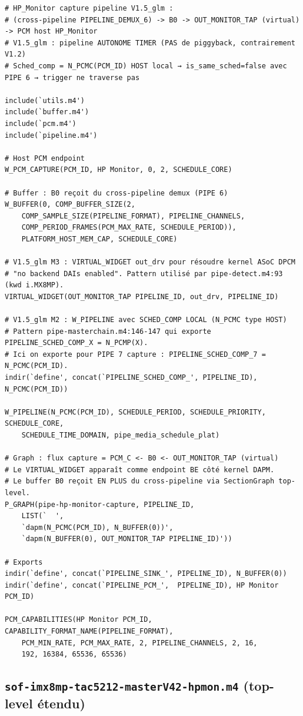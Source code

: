 \documentclass[11pt,a4paper]{article}
\begin{document}
\begin{lstlisting}[language={}, basicstyle=\ttfamily\scriptsize]
# HP_Monitor capture pipeline V1.5_glm :
# (cross-pipeline PIPELINE_DEMUX_6) -> B0 -> OUT_MONITOR_TAP (virtual) -> PCM host HP_Monitor
# V1.5_glm : pipeline AUTONOME TIMER (PAS de piggyback, contrairement V1.2)
# Sched_comp = N_PCMC(PCM_ID) HOST local → is_same_sched=false avec PIPE 6 → trigger ne traverse pas

include(`utils.m4')
include(`buffer.m4')
include(`pcm.m4')
include(`pipeline.m4')

# Host PCM endpoint
W_PCM_CAPTURE(PCM_ID, HP Monitor, 0, 2, SCHEDULE_CORE)

# Buffer : B0 reçoit du cross-pipeline demux (PIPE 6)
W_BUFFER(0, COMP_BUFFER_SIZE(2,
	COMP_SAMPLE_SIZE(PIPELINE_FORMAT), PIPELINE_CHANNELS,
	COMP_PERIOD_FRAMES(PCM_MAX_RATE, SCHEDULE_PERIOD)),
	PLATFORM_HOST_MEM_CAP, SCHEDULE_CORE)

# V1.5_glm M3 : VIRTUAL_WIDGET out_drv pour résoudre kernel ASoC DPCM
# "no backend DAIs enabled". Pattern utilisé par pipe-detect.m4:93 (kwd i.MX8MP).
VIRTUAL_WIDGET(OUT_MONITOR_TAP PIPELINE_ID, out_drv, PIPELINE_ID)

# V1.5_glm M2 : W_PIPELINE avec SCHED_COMP LOCAL (N_PCMC type HOST)
# Pattern pipe-masterchain.m4:146-147 qui exporte PIPELINE_SCHED_COMP_X = N_PCMP(X).
# Ici on exporte pour PIPE 7 capture : PIPELINE_SCHED_COMP_7 = N_PCMC(PCM_ID).
indir(`define', concat(`PIPELINE_SCHED_COMP_', PIPELINE_ID), N_PCMC(PCM_ID))

W_PIPELINE(N_PCMC(PCM_ID), SCHEDULE_PERIOD, SCHEDULE_PRIORITY, SCHEDULE_CORE,
	SCHEDULE_TIME_DOMAIN, pipe_media_schedule_plat)

# Graph : flux capture = PCM_C <- B0 <- OUT_MONITOR_TAP (virtual)
# Le VIRTUAL_WIDGET apparaît comme endpoint BE côté kernel DAPM.
# Le buffer B0 reçoit EN PLUS du cross-pipeline via SectionGraph top-level.
P_GRAPH(pipe-hp-monitor-capture, PIPELINE_ID,
	LIST(`	',
	`dapm(N_PCMC(PCM_ID), N_BUFFER(0))',
	`dapm(N_BUFFER(0), OUT_MONITOR_TAP PIPELINE_ID)'))

# Exports
indir(`define', concat(`PIPELINE_SINK_', PIPELINE_ID), N_BUFFER(0))
indir(`define', concat(`PIPELINE_PCM_',  PIPELINE_ID), HP Monitor PCM_ID)

PCM_CAPABILITIES(HP Monitor PCM_ID, CAPABILITY_FORMAT_NAME(PIPELINE_FORMAT),
	PCM_MIN_RATE, PCM_MAX_RATE, 2, PIPELINE_CHANNELS, 2, 16,
	192, 16384, 65536, 65536)
\end{lstlisting}

\subsection{\texttt{sof-imx8mp-tac5212-masterV42-hpmon.m4} (top-level étendu)}
\end{document}
